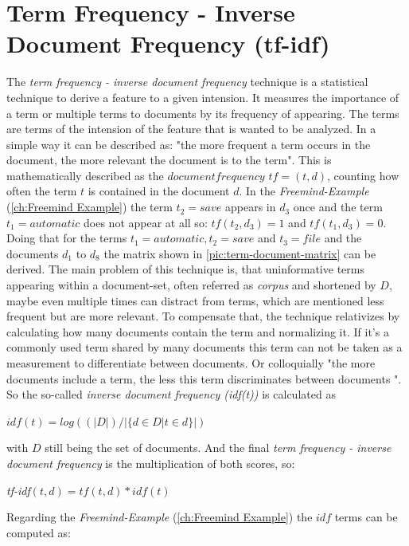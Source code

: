 \section{Term Frequency - Inverse Document Frequency (tf-idf)}
\label{sec:tf-idf}
The \emph{term frequency - inverse document frequency} technique is a statistical technique to derive a feature to a given intension. It measures the importance of a term or multiple terms to documents by its frequency of appearing. The terms are terms of the intension of the feature that is wanted to be analyzed. In a simple way it can be described as: "the more frequent a term occurs in the document, the more relevant the document is to the term". \newline
This is mathematically described as the $document frequency$ $tf=(t,d)$, counting how often the term $t$ is contained in the document $d$.
In the \textit{Freemind-Example} (\autoref{ch:Freemind Example}) the term $t_2 = save$ appears in $d_3$ once and the term $t_1 = automatic$ does not appear at all so: $tf(t_2,d_3) = 1$ and $tf(t_1,d_3)=0$. \newline
Doing that for the terms $t_1 = automatic, t_2 = save$ and $t_3 = file$ and the documents $d_1$ to $d_8$ the matrix shown in \autoref{pic:term-document-matrix} can be derived.
The main problem of this technique is, that uninformative terms appearing within a document-set, often referred as \emph{corpus} and shortened by $D$, maybe even multiple times can distract from terms, which are mentioned less frequent but are more relevant. To compensate that, the technique relativizes by calculating how many documents contain the term and normalizing it. If it's a commonly used term shared by many documents this term can not be taken as a measurement to differentiate between documents. Or colloquially "the more documents include a term, the less this term discriminates between documents ". \newline
So the so-called \emph{inverse document frequency (idf(t))} is calculated as
\begin{center} $idf(t) = log((|D|)/|\{ d \in D | t \in d \}|)$  \end{center}
with $D$ still being the set of documents. And the final \emph{term frequency - inverse document frequency} is the multiplication of both scores, so:
\begin{center} \emph{tf-idf}$(t,d) = tf(t,d) * idf(t)$\end{center}
Regarding the \textit{Freemind-Example} (\autoref{ch:Freemind Example}) the $idf$ terms can be computed as:

